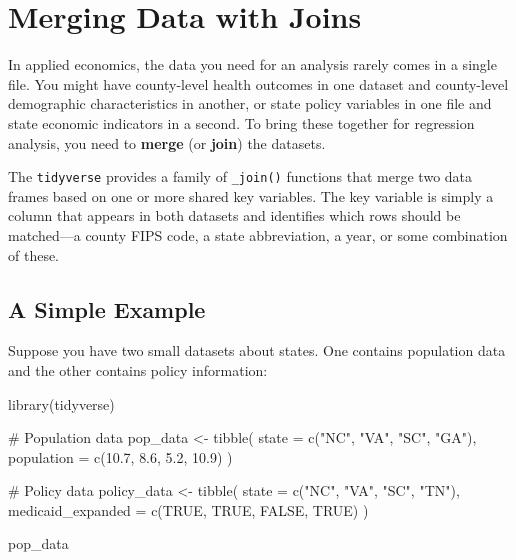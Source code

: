 \documentclass[
  letterpaper,
  DIV=11,
  numbers=noendperiod]{scrreprt}
\newenvironment{Shaded}{\begin{snugshade}}{\end{snugshade}}
\newcommand{\AttributeTok}[1]{\textcolor[rgb]{0.40,0.45,0.13}{#1}}
\newcommand{\CommentTok}[1]{\textcolor[rgb]{0.37,0.37,0.37}{#1}}
\newcommand{\ConstantTok}[1]{\textcolor[rgb]{0.56,0.35,0.01}{#1}}
\newcommand{\FloatTok}[1]{\textcolor[rgb]{0.68,0.00,0.00}{#1}}
\newcommand{\FunctionTok}[1]{\textcolor[rgb]{0.28,0.35,0.67}{#1}}
\newcommand{\NormalTok}[1]{\textcolor[rgb]{0.00,0.23,0.31}{#1}}
\newcommand{\OtherTok}[1]{\textcolor[rgb]{0.00,0.23,0.31}{#1}}
\newcommand{\StringTok}[1]{\textcolor[rgb]{0.13,0.47,0.30}{#1}}
\begin{document}
\section{Merging Data with Joins}\label{merging-data-with-joins}

In applied economics, the data you need for an analysis rarely comes in
a single file. You might have county-level health outcomes in one
dataset and county-level demographic characteristics in another, or
state policy variables in one file and state economic indicators in a
second. To bring these together for regression analysis, you need to
\textbf{merge} (or \textbf{join}) the datasets.

The \texttt{tidyverse} provides a family of \texttt{\_join()} functions
that merge two data frames based on one or more shared key variables.
The key variable is simply a column that appears in both datasets and
identifies which rows should be matched---a county FIPS code, a state
abbreviation, a year, or some combination of these.

\subsection{A Simple Example}\label{a-simple-example}

Suppose you have two small datasets about states. One contains
population data and the other contains policy information:

\begin{Shaded}
\begin{Highlighting}[]
\FunctionTok{library}\NormalTok{(tidyverse)}

\CommentTok{\# Population data}
\NormalTok{pop\_data }\OtherTok{\textless{}{-}} \FunctionTok{tibble}\NormalTok{(}
    \AttributeTok{state =} \FunctionTok{c}\NormalTok{(}\StringTok{"NC"}\NormalTok{, }\StringTok{"VA"}\NormalTok{, }\StringTok{"SC"}\NormalTok{, }\StringTok{"GA"}\NormalTok{),}
    \AttributeTok{population =} \FunctionTok{c}\NormalTok{(}\FloatTok{10.7}\NormalTok{, }\FloatTok{8.6}\NormalTok{, }\FloatTok{5.2}\NormalTok{, }\FloatTok{10.9}\NormalTok{)}
\NormalTok{)}

\CommentTok{\# Policy data}
\NormalTok{policy\_data }\OtherTok{\textless{}{-}} \FunctionTok{tibble}\NormalTok{(}
    \AttributeTok{state =} \FunctionTok{c}\NormalTok{(}\StringTok{"NC"}\NormalTok{, }\StringTok{"VA"}\NormalTok{, }\StringTok{"SC"}\NormalTok{, }\StringTok{"TN"}\NormalTok{),}
    \AttributeTok{medicaid\_expanded =} \FunctionTok{c}\NormalTok{(}\ConstantTok{TRUE}\NormalTok{, }\ConstantTok{TRUE}\NormalTok{, }\ConstantTok{FALSE}\NormalTok{, }\ConstantTok{TRUE}\NormalTok{)}
\NormalTok{)}

\NormalTok{pop\_data}
\end{Highlighting}
\end{Shaded}
\end{document}
